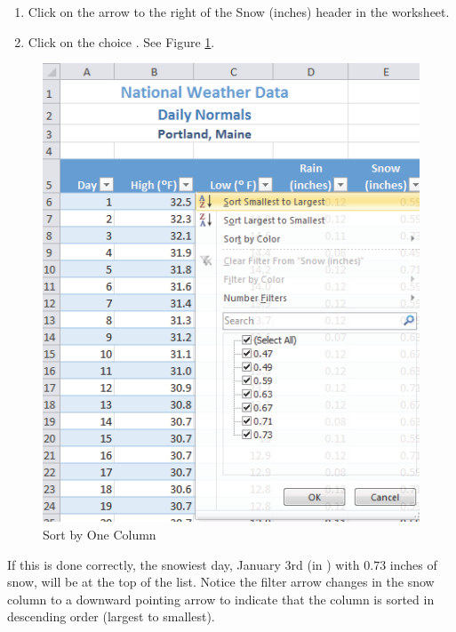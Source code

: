 \begin{enumerate}
	\item Click on the arrow to the right of the Snow (inches) header in the  worksheet.
	\item Click on the choice . See Figure \ref{05:fig08}.
\end{enumerate}

\begin{figure}[H]
	\centering
	\includegraphics[width=\maxwidth{.95\linewidth}]{gfx/ch05_fig08}
	\caption{Sort by One Column}
	\label{05:fig08}
\end{figure}

If this is done correctly, the snowiest day, January 3rd (in ) with $ 0.73 $ inches of snow, will be at the top of the list. Notice the filter arrow changes in the snow column to a downward pointing arrow to indicate that the column is sorted in descending order (largest to smallest).

